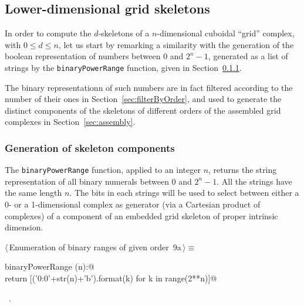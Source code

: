 \documentclass[11pt,oneside]{article}	%
\begin{document}
\subsection{Lower-dimensional grid skeletons}

In order to compute the $d$-skeletons of a $n$-dimensional cuboidal ``grid'' complex, with $0\leq d\leq n$, let us start by remarking a similarity with the generation of the boolean representation of numbers between 0 and $2^n -1$, generated as a list of strings by the \texttt{binaryPowerRange} function, given in Section~\ref{sec:binaryPowerRange}.

The binary representationn of such numbers are in fact filtered according to the number of their ones in Section~\ref{sec:filterByOrder}, and used to generate the distinct components of the skeletons of different orders of the assembled grid complexes in Section~\ref{sec:assembly}.

\subsubsection{Generation of skeleton components}
\label{sec:binaryPowerRange}

The \texttt{binaryPowerRange} function, applied to an integer $n$, returns the string representation of all binary numerals between 0 and $2^n -1$. All the strings have the same length $n$. The bits in each strings will be used to select between either a 0- or a 1-dimensional complex as generator (via a Cartesian product of complexes) of a component of an embedded grid skeleton of proper intrinsic dimension.

\begin{flushleft} \small \label{scrap11}
\protect{}$\langle\,$Enumeration of binary ranges of given order\nobreak\ {\footnotesize 9a}$\,\rangle\equiv$
\vspace{-1ex}
\begin{list}{}{} \item
\mbox{}\verb@def binaryPowerRange (n):@\\
\mbox{}\verb@    return [('{0:0'+str(n)+'b}').format(k) for k in range(2**n)]@\\
\mbox{}\verb@@{\NWsep}
\end{list}
\vspace{-1ex}
\footnotesize\addtolength{\baselineskip}{-1ex}
\begin{list}{}{\setlength{\itemsep}{-\parsep}\setlength{\itemindent}{-\leftmargin}}
\item \NWtxtMacroRefIn\ .
\end{list}
\end{flushleft}
\end{document}
